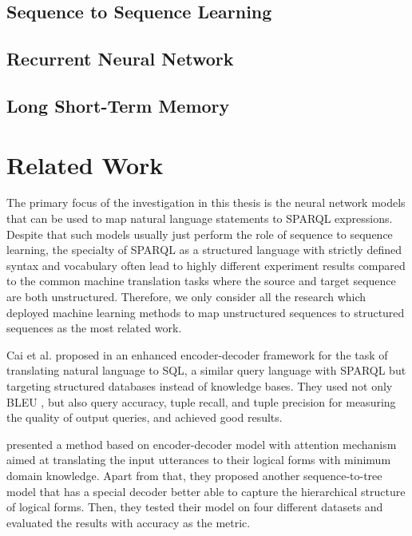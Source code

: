 

\subsection{Sequence to Sequence Learning}


\subsection{Recurrent Neural Network}


\subsection{Long Short-Term Memory}


\section{Related Work} \label{section:related work}

The primary focus of the investigation in this thesis is the neural network models that can be used to map natural language statements to SPARQL expressions. Despite that such models usually just perform the role of sequence to sequence learning, the specialty of SPARQL as a structured language with strictly defined syntax and vocabulary often lead to highly different experiment results compared to the common machine translation tasks where the source and target sequence are both unstructured. Therefore, we only consider all the research which deployed machine learning methods to map unstructured sequences to structured sequences as the most related work.

Cai et al. proposed in \cite{Cai2017} an enhanced encoder-decoder framework for the task of translating natural language to SQL, a similar query language with SPARQL but targeting structured databases instead of knowledge bases. They used not only BLEU \cite{Papineni2002}, but also query accuracy, tuple recall, and tuple precision for measuring the quality of output queries, and achieved good results.

\cite{dong2016language} presented a method based on encoder-decoder model with attention mechanism aimed at translating the input utterances to their logical forms with minimum domain knowledge. Apart from that, they proposed another sequence-to-tree model that has a special decoder better able to capture the hierarchical structure of logical forms. Then, they tested their model on four different datasets and evaluated the results with accuracy as the metric. 

